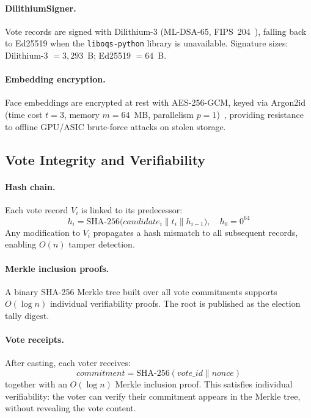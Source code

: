 \documentclass[pdflatex,sn-mathphys-num]{sn-jnl}%
\theoremstyle{thmstyleone}%
\theoremstyle{thmstyletwo}%
\theoremstyle{thmstylethree}%
\begin{document}
\paragraph{DilithiumSigner.} Vote records are signed with Dilithium-3
(ML-DSA-65, FIPS~204~\cite{nist_fips204}), falling back to Ed25519 when the
\texttt{liboqs-python} library is unavailable. Signature sizes: Dilithium-3
$= 3{,}293$~B; Ed25519 $= 64$~B.

\paragraph{Embedding encryption.} Face embeddings are encrypted at rest with
AES-256-GCM, keyed via Argon2id (time cost $t=3$, memory $m=64$~MB,
parallelism $p=1$)~\cite{biryukov2015argon2}, providing resistance to offline
GPU/ASIC brute-force attacks on stolen storage.

\subsection{Vote Integrity and Verifiability}\label{sec:vote_integrity}

\paragraph{Hash chain.} Each vote record $V_i$ is linked to its predecessor:
\begin{equation}
  h_i = \mathrm{SHA}\text{-}256\!\bigl(\mathit{candidate}_i \| t_i \| h_{i-1}\bigr),
  \quad h_0 = 0^{64}
\end{equation}
Any modification to $V_i$ propagates a hash mismatch to all subsequent records,
enabling $O(n)$ tamper detection.

\paragraph{Merkle inclusion proofs.} A binary SHA-256 Merkle tree built over all
vote commitments supports $O(\log n)$ individual verifiability proofs. The root
is published as the election tally digest.

\paragraph{Vote receipts.} After casting, each voter receives:
\begin{equation}
  \mathit{commitment} = \mathrm{SHA}\text{-}256(\mathit{vote\_id} \| \mathit{nonce})
\end{equation}
together with an $O(\log n)$ Merkle inclusion proof. This satisfies individual
verifiability: the voter can verify their commitment appears in the Merkle tree,
without revealing the vote content.
\end{document}
